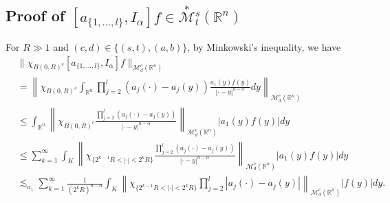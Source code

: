 \documentclass[11pt,a4]{article}
\numberwithin{equation}{section}
\theoremstyle{definition}
\theoremstyle{remark}
\begin{document}
\subsection{Proof of $[a_{\{1, ... , l\}},I_{\alpha}]f \in \overset{*}{{\mathcal M}}{}^s_t({\mathbb R}^n)$}
For $R\gg1$ and $(c,d) \in \{(s,t),(a,b)\}$, by Minkowski's inequality, we have
\begin{align*}
	&\| \chi_{{B(0,R)}^c} [a_{\{1, ... , l\}},I_{\alpha}]f \|_{{\mathcal M}^c_d({\mathbb R}^n)}\\
	&=\left\| \chi_{{B(0,R)}^c} \int_{{\mathbb R}^n} \prod_{j=2}^l \left(a_j(\cdot)-a_j(y)\right) \frac{a_1(y)f(y)}{|\cdot-y|^{n-\alpha}} dy\right\|_{{\mathcal M}^c_d({\mathbb R}^n)}\\
	&\le \int_{{\mathbb R}^n} \left\| \chi_{{B(0,R)}^c}\frac{\prod_{j=2}^l \left(a_j(\cdot)-a_j(y)\right)}{|\cdot-y|^{n-\alpha}}\right\|_{{\mathcal M}^c_d({\mathbb R}^n)} |a_1(y)f(y)|dy\\
	&\le \sum_{k=1}^{\infty}\int_{K} \left\| \chi_{\{2^{k-1}R<|\cdot|<2^kR\}}\frac{\prod_{j=2}^l \left(a_j(\cdot)-a_j(y)\right)}{|\cdot-y|^{n-\alpha}}\right\|_{{\mathcal M}^c_d({\mathbb R}^n)} |a_1(y)f(y)|dy\\
	&\lesssim_{a_1}\sum_{k=1}^{\infty} \frac{1}{(2^kR)^{n-\alpha}} \int_K \left\| \chi_{\{2^{k-1}R<|\cdot|<2^kR\}} \prod_{j=2}^l{|a_j(\cdot)-a_j(y)|}\right\|_{{\mathcal M}^c_d({\mathbb R}^n)} |f(y)|dy.\\
\end{align*}
\end{document}
